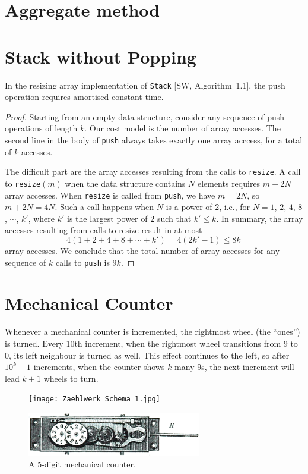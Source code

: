 \documentclass{tstextbook}
\begin{document}
\section{Aggregate method}

\section{Stack without Popping}
\label{sec: nopop}

\begin{theorem}
  \label{prop: E half}
  In the resizing array
  implementation of {\tt Stack} [SW, Algorithm~1.1], the push operation 
  requires amortised constant time.
\end{theorem}
\begin{proof}
  Starting from an empty data structure, consider any sequence of push operations of length $k$.
  Our cost model is the number of array accesses.
  The second line in the body of \texttt{push} always takes exactly one array acccess, for a total of $k$ accesses.

  The difficult part are the array accesses resulting from the calls to \texttt{resize}.
  A call to \texttt{resize}$(m)$ when the data structure contains $N$ elements requires $m+2N$ array accesses.
  When \texttt{resize} is called from \texttt{push}, we have $m = 2N$, so $m+2N=4N$.
  Such a call happens when $N$ is a power of $2$, i.e., for $N=1$, $2$, $4$, $8$, $\cdots$, $k'$,
  where $k'$ is the largest power of $2$ such that $k'\leq k$.
  In summary, the array accesses resulting from calls to resize result in at most
  \[ 4(1 + 2 + 4 + 8 + \cdots + k') = 4(2k'-1)\leq 8k\,\] 
  array accesses.
  We conclude that the total number of array accesses for any sequence of $k$ calls to \texttt{push} is $9k$.
\end{proof}

\section{Mechanical Counter}

Whenever a mechanical counter is incremented, the rightmost wheel (the
``ones'') is turned. Every 10th increment, when the rightmost wheel
transitions from 9 to 0, its left neighbour is turned as well. This
effect continues to the left, so after $10^k-1$ increments, when the
counter shows $k$ many 9s, the next increment will lead $k+1$ wheels to
turn.

\begin{figure}[htb]
  \centerline{\texttt{[image: Zaehlwerk\_Schema\_1.jpg]}}
  \centerline{\includegraphics[width=3in]{Zaehlwerk_Schema_2_clean.png}}
\caption{A 5-digit mechanical counter.}
\end{figure}
\end{document}
